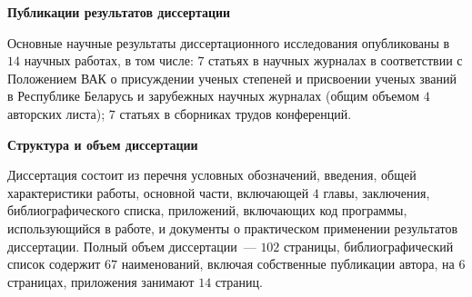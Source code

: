 \documentclass[_00_autoref.tex]{subfiles}
\begin{document}
\medskip
\centerline{\textbf{Публикации результатов диссертации}}

Основные научные результаты диссертационного исследования опубликованы в $14$ научных работах, в том числе: $7$ статьях в научных журналах в соответствии с Положением ВАК о присуждении ученых степеней и присвоении ученых званий в Республике Беларусь и зарубежных научных журналах (общим объемом $4$ авторских листа); $7$ статьях в сборниках трудов конференций.

\medskip
\centerline{\textbf{Структура и объем диссертации}}

Диссертация состоит из перечня условных обозначений, введения, общей характеристики работы, основной части, включающей $4$ главы, заключения, библиографического списка, приложений, включающих код программы, использующийся в работе, и документы о практическом применении результатов диссертации.
Полный объем диссертации~--- $102$ страницы, библиографический список содержит $67$ наименований, включая собственные публикации автора, на $6$ страницах, приложения занимают $14$ страниц.
\end{document}
